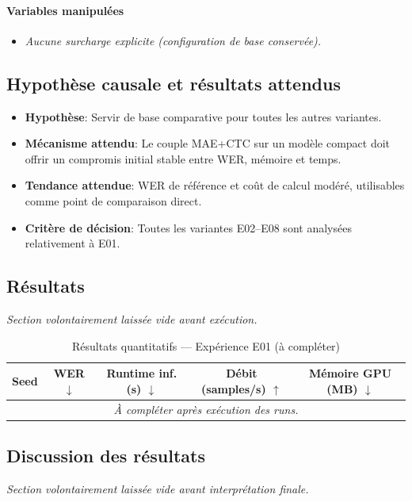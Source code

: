 \documentclass[11pt,a4paper]{article}
\begin{document}
\paragraph{Variables manipulées}
\begin{itemize}
\item \textit{Aucune surcharge explicite (configuration de base conservée).}
\end{itemize}

\subsection{Hypothèse causale et résultats attendus}
\begin{itemize}[leftmargin=1.2cm]
\item \textbf{Hypothèse}: Servir de base comparative pour toutes les autres variantes.
\item \textbf{Mécanisme attendu}: Le couple MAE+CTC sur un modèle compact doit offrir un compromis initial stable entre WER, mémoire et temps.
\item \textbf{Tendance attendue}: WER de référence et coût de calcul modéré, utilisables comme point de comparaison direct.
\item \textbf{Critère de décision}: Toutes les variantes E02--E08 sont analysées relativement à E01.
\end{itemize}

\subsection{Résultats}
\textit{Section volontairement laissée vide avant exécution.}

\begin{table}[H]
\centering
\caption{Résultats quantitatifs --- Expérience E01 (à compléter)}
\begin{tabular}{lcccc}
\toprule
Seed & WER $\downarrow$ & Runtime inf. (s) $\downarrow$ & Débit (samples/s) $\uparrow$ & Mémoire GPU (MB) $\downarrow$ \\
\midrule
\multicolumn{5}{c}{\textit{À compléter après exécution des runs.}} \\
\bottomrule
\end{tabular}
\end{table}

\subsection{Discussion des résultats}
\textit{Section volontairement laissée vide avant interprétation finale.}
\end{document}
